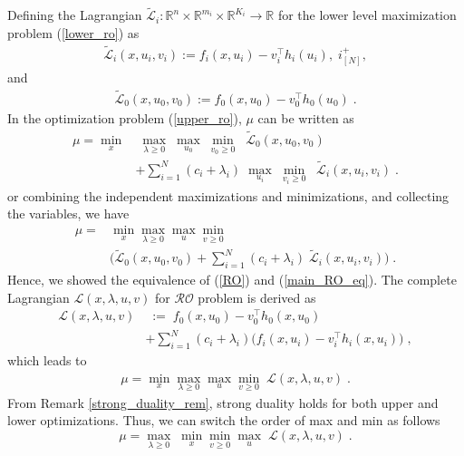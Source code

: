 \documentclass[journal,twoside,web]{ieeecolor}
\begin{document}
Defining the Lagrangian $\tilde{\mathcal{L}}_i:\mathbb{R}^n \times \mathbb{R}^{m_i} \times \mathbb{R}^{K_i} \rightarrow \mathbb{R}$ for the lower level maximization problem (\ref{lower_ro}) as
\begin{align} \label{lower_lag}
\tilde{\mathcal{L}}_i(x,u_i,v_i):=f_i(x,u_i)-v_i^\top h_{i}(u_i),\;i^+_{[N]},
\end{align}
and
\begin{align} \label{upper_lag}
\tilde{\mathcal{L}}_0(x,u_0,v_0):=f_0(x,u_0)-v_0^\top h_{0}(u_0)\;.
\end{align}
In the optimization problem (\ref{upper_ro}), $\mu$ can be written as
\begin{align} \label{main_RO_eq}
\mu=\underset{x}{\min}&\;\underset{\lambda\geq 0}{\max}\;\underset{u_0}{\max}\;\underset{v_0\geq 0}{\min}\;\; \tilde{\mathcal{L}}_0(x,u_0,v_0)\nonumber\\
&+\sum_{i=1}^N (c_i+\lambda_i)\; \underset{u_i}{\max}\;\underset{v_{i}\geq 0}{\min}\;\;\tilde{\mathcal{L}}_i(x,u_i,v_i)\;.
\end{align}
or combining the independent maximizations and minimizations, and collecting the variables, we have
\begin{align}\label{main_RO2_eq}
\mu=&\min_{x}\max_{\lambda\geq 0}\max_{u}\min_{v\geq 0} \nonumber\\
&\big(\tilde{\mathcal{L}}_0(x,u_0,v_0)+\sum_{i=1}^N (c_i+\lambda_i) \; \tilde{\mathcal{L}}_i(x,u_i,v_i)\big)\;.
\end{align}
Hence, we showed the equivalence of (\ref{RO}) and (\ref{main_RO_eq}).
The complete Lagrangian $\mathcal{L}(x,\lambda,u,v)$ for $\mathcal{RO}$ problem is derived as
\begin{align}
\mathcal{L}(x,\lambda,u,v)&\;:=\;f_0(x,u_0)-v_0^\top h_0(x,u_0)\nonumber\\
&+\sum_{i=1}^N (c_i+\lambda_i)\big(f_i(x,u_i)-v_i^\top h_i(x,u_i)\big)\;,
\label{lag}
\end{align}
which leads to
\begin{align*}
\mu=\min_{x}\max_{\lambda\geq 0}\max_{u}\min_{v\geq 0}\;\mathcal{L}(x,\lambda,u,v)\;.
\end{align*}
From Remark \ref{strong_duality_rem}, strong duality holds for both upper and lower optimizations. Thus, we can switch the order of max and min as follows
\begin{equation}\label{dual.eq}
\mu=\max_{\lambda\geq 0}\;\min_{x}\min_{v\geq 0} \max_{u}\;\mathcal{L}(x,\lambda,u,v)\;.
\end{equation}
\end{document}
